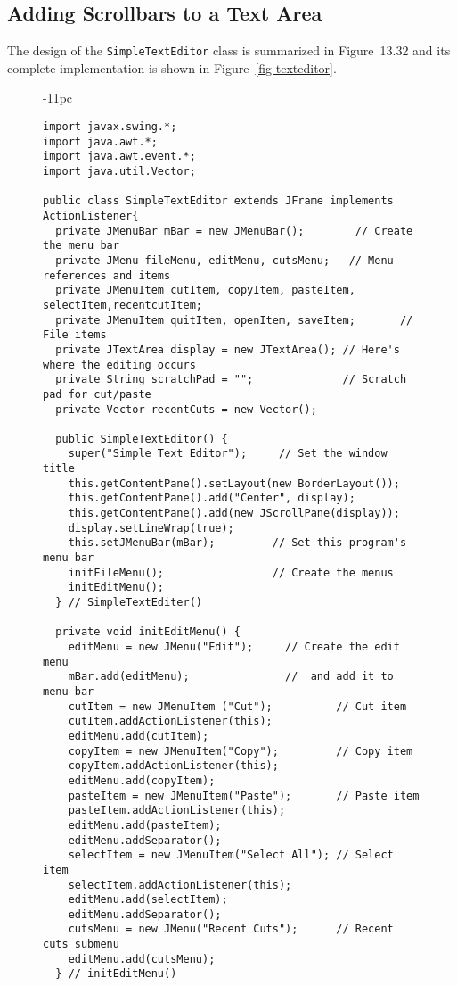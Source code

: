 \subsection{Adding Scrollbars to a Text Area}
\noindent The design of the {\tt SimpleTextEditor} class is summarized in
Figure~13.32 and its complete implementation is shown in
Figure~\ref{fig-texteditor}. 
\pagebreak
\begin{figure}[h!]
\jjjprogstart
\begin{jjjlistingleft}[37pc]{-11pc}
\begin{lstlisting}
import javax.swing.*;
import java.awt.*;
import java.awt.event.*;
import java.util.Vector;

public class SimpleTextEditor extends JFrame implements ActionListener{
  private JMenuBar mBar = new JMenuBar();        // Create the menu bar
  private JMenu fileMenu, editMenu, cutsMenu;   // Menu references and items
  private JMenuItem cutItem, copyItem, pasteItem, selectItem,recentcutItem; 
  private JMenuItem quitItem, openItem, saveItem;       // File items
  private JTextArea display = new JTextArea(); // Here's where the editing occurs
  private String scratchPad = "";              // Scratch pad for cut/paste
  private Vector recentCuts = new Vector();

  public SimpleTextEditor() {
    super("Simple Text Editor");     // Set the window title
    this.getContentPane().setLayout(new BorderLayout());
    this.getContentPane().add("Center", display);
    this.getContentPane().add(new JScrollPane(display));
    display.setLineWrap(true);
    this.setJMenuBar(mBar);         // Set this program's menu bar
    initFileMenu();                 // Create the menus
    initEditMenu();
  } // SimpleTextEditer()

  private void initEditMenu() {
    editMenu = new JMenu("Edit");     // Create the edit menu
    mBar.add(editMenu);               //  and add it to menu bar
    cutItem = new JMenuItem ("Cut");          // Cut item
    cutItem.addActionListener(this);
    editMenu.add(cutItem);
    copyItem = new JMenuItem("Copy");         // Copy item
    copyItem.addActionListener(this);
    editMenu.add(copyItem);
    pasteItem = new JMenuItem("Paste");       // Paste item
    pasteItem.addActionListener(this);
    editMenu.add(pasteItem);
    editMenu.addSeparator();
    selectItem = new JMenuItem("Select All"); // Select item
    selectItem.addActionListener(this);
    editMenu.add(selectItem);
    editMenu.addSeparator();
    cutsMenu = new JMenu("Recent Cuts");      // Recent cuts submenu
    editMenu.add(cutsMenu);
  } // initEditMenu()


\end{lstlisting}
\end{jjjlistingleft}
\end{figure}
